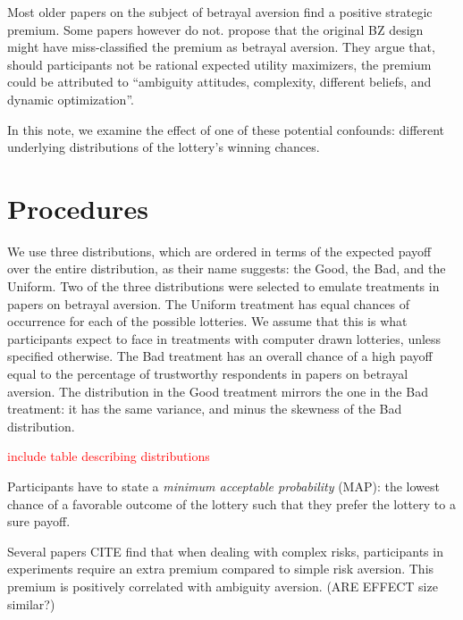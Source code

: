 Most older papers on the subject of betrayal aversion find a positive strategic premium.
Some papers however do not.
\cite{Li2020a} propose that the original BZ design might have miss-classified the premium as betrayal aversion.
They argue that, should participants not be rational expected utility maximizers, the premium could be attributed to ``ambiguity attitudes, complexity, different beliefs, and dynamic optimization''.

In this note, we examine the effect of one of these potential confounds: different underlying distributions of the lottery's winning chances.

\section{Procedures}\label{sec:proced}
We use three distributions, which are ordered in terms of the expected payoff over the entire distribution, as their name suggests: the Good, the Bad, and the Uniform.
Two of the three distributions were selected to emulate treatments in papers on betrayal aversion.
The Uniform treatment has equal chances of occurrence for each of the possible lotteries.
We assume that this is what participants expect to face in treatments with computer drawn lotteries, unless specified otherwise.
The Bad treatment has an overall chance of a high payoff equal to the percentage of trustworthy respondents in papers on betrayal aversion.
The distribution in the Good treatment mirrors the one in the Bad treatment: it has the same variance, and minus the skewness of the Bad distribution.

\textcolor{red}{include table describing distributions}

Participants have to state a \textit{minimum acceptable probability} (MAP): the lowest chance of a favorable outcome of the lottery such that they prefer the lottery to a sure payoff.

Several papers CITE find that when dealing with complex risks, participants in experiments require an extra premium compared to simple risk aversion.
This premium is positively correlated with ambiguity aversion. (ARE EFFECT size similar?)




